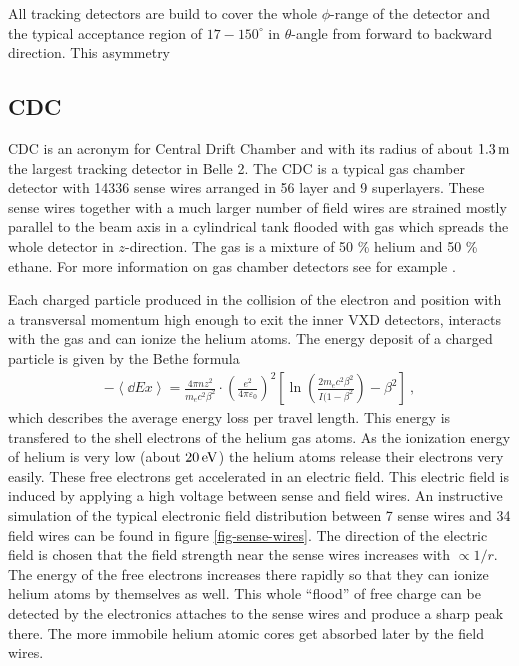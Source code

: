 All tracking detectors are build to cover the whole $\phi$-range of the detector and the typical acceptance region of $17-150 ^\circ$ in $\theta$-angle from forward to backward direction. This asymmetry 

\subsection{CDC}

CDC is an acronym for Central Drift Chamber and with its radius of about $\unit[1.3]{m}$ the largest tracking detector in Belle 2. The CDC is a typical gas chamber detector with 14336 sense wires arranged in 56 layer and 9 superlayers. These sense wires together with a much larger number of field wires are strained mostly parallel to the beam axis in a cylindrical tank flooded with gas which spreads the whole detector in $z$-direction. The gas is a mixture of 50 \% helium and 50 \% ethane. For more information on gas chamber detectors see for example \cite{grupen}.

Each charged particle produced in the collision of the electron and position with a transversal momentum high enough to exit the inner VXD detectors, interacts with the gas and can ionize the helium atoms. The energy deposit of a charged particle is given by the Bethe formula \cite{bethe}
\begin{align}
 - \left\langle \dd{E}{x} \right\rangle = \frac{4 \pi n z^2}{m_e c^2 \beta^2} \cdot \left( \frac{e^2}{4 \pi \varepsilon_0} \right)^2 \left[ \ln\left( \frac{2 m_e c^2 \beta^2}{I(1 - \beta^2} \right) - \beta^2 \right] \ , \label{form-bethe}
\end{align}
which describes the average energy loss per travel length. This energy is transfered to the shell electrons of the helium gas atoms. As the ionization energy of helium is very low (about $\unit[20]{eV}$) the helium atoms release their electrons very easily. These free electrons get accelerated in an electric field. This electric field is induced by applying a high voltage between sense and field wires. An instructive simulation of the typical electronic field distribution between 7 sense wires and 34 field wires can be found in figure \ref{fig-sense-wires}. The direction of the electric field is chosen that the field strength near the sense wires increases with $\propto 1/r$. The energy of the free electrons increases there rapidly so that they can ionize helium atoms by themselves as well. This whole ``flood'' of free charge can be detected by the electronics attaches to the sense wires and produce a sharp peak there. The more immobile helium atomic cores get absorbed later by the field wires. 

